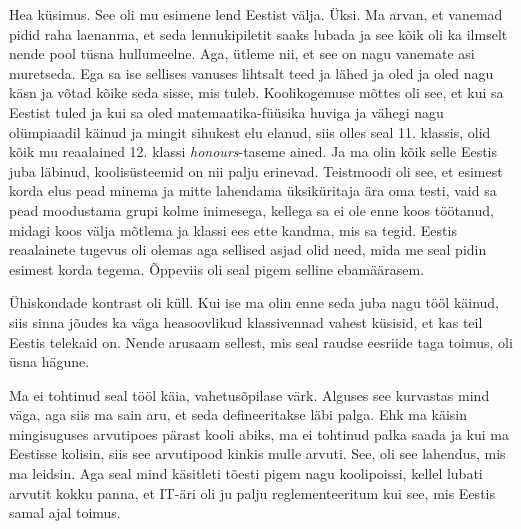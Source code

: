 Hea küsimus. See oli mu esimene lend Eestist välja. Üksi. Ma arvan, et vanemad pidid raha laenanma, et seda lennukipiletit saaks lubada ja see kõik oli ka ilmselt nende pool tüsna hullumeelne. Aga, ütleme nii, et see on nagu vanemate asi muretseda.  Ega sa ise sellises vanuses lihtsalt teed ja lähed ja oled ja oled nagu käsn ja võtad kõike seda sisse, mis tuleb. Koolikogemuse mõttes oli see, et kui sa Eestist tuled ja kui sa oled  matemaatika-füüsika huviga ja vähegi nagu olümpiaadil käinud ja mingit sihukest elu elanud, siis olles seal 11. klassis, olid kõik mu reaalained 12. klassi \emph{honours}-taseme ained. Ja ma olin kõik selle Eestis juba läbinud, koolisüsteemid on nii palju erinevad. Teistmoodi oli see, et  esimest korda elus pead minema ja mitte lahendama üksiküritaja ära oma testi, vaid  sa pead moodustama grupi kolme inimesega, kellega sa ei ole enne koos töötanud, midagi koos välja mõtlema ja klassi ees ette kandma, mis sa tegid. Eestis reaalainete tugevus oli olemas aga sellised asjad olid need, mida  me seal pidin esimest korda tegema. Õppeviis oli seal pigem selline ebamäärasem. 

Ühiskondade kontrast oli küll. Kui ise ma olin enne seda juba nagu tööl käinud, siis sinna jõudes ka väga heasoovlikud klassivennad vahest küsisid, et kas teil Eestis telekaid on. Nende arusaam sellest, mis seal raudse eesriide taga  toimus, oli üsna hägune. 


Ma ei tohtinud seal tööl käia, vahetusõpilase värk. Alguses see kurvastas mind väga, aga siis ma sain aru, et seda defineeritakse läbi palga. Ehk ma käisin mingisuguses arvutipoes pärast kooli abiks, ma ei tohtinud palka saada ja kui ma Eestisse kolisin, siis see arvutipood kinkis mulle arvuti. See, oli see lahendus, mis ma leidsin. Aga seal mind käsitleti tõesti pigem nagu koolipoissi, kellel lubati arvutit kokku panna, et IT-äri oli ju palju reglementeeritum kui see, mis  Eestis samal ajal toimus. 


